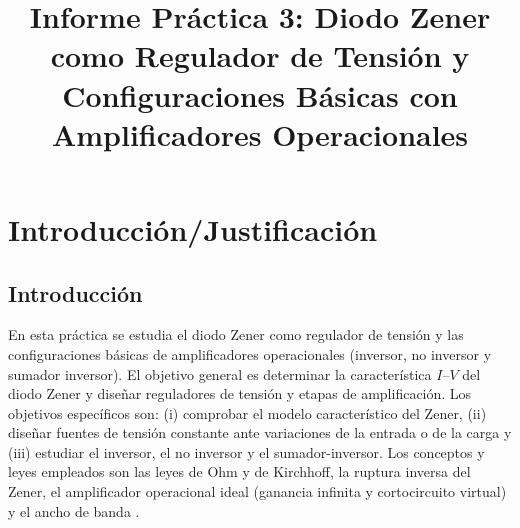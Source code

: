 \documentclass[9pt, conference]{IEEEtran}
\begin{document}
\title{Informe Práctica 3: Diodo Zener como Regulador de Tensión y Configuraciones Básicas con Amplificadores Operacionales}

\author{
\and
{}
\and
{}
}

\maketitle

\section{Introducción/Justificación}

\subsection{Introducción}
En esta práctica se estudia el diodo Zener como regulador de tensión y las configuraciones básicas de amplificadores operacionales (inversor, no inversor y sumador inversor). El objetivo general es determinar la característica $I$--$V$ del diodo Zener y diseñar reguladores de tensión y etapas de amplificación. Los objetivos específicos son: (i) comprobar el modelo característico del Zener, (ii) diseñar fuentes de tensión constante ante variaciones de la entrada o de la carga y (iii) estudiar el inversor, el no inversor y el sumador-inversor. Los conceptos y leyes empleados son las leyes de Ohm y de Kirchhoff, la ruptura inversa del Zener, el amplificador operacional ideal (ganancia infinita y cortocircuito virtual) y el ancho de banda \cite{sedra}.
\end{document}
